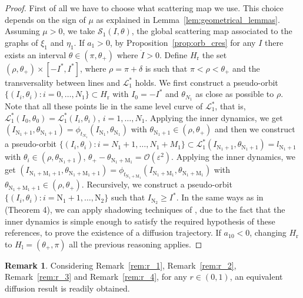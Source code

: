 \documentclass[a4paper,10pt]{article}
\newcommand{\M}{\text{M}}
\newcommand{\NH}{\text{NHIM}}
\newcommand{\zerom}{\text{1}}
\theoremstyle{definition}
\newtheorem{remark}[theorem]{Remark}
\begin{document}
\begin{proof}
First of all we have to choose what scattering map we use.
This choice depends on the sign of $\mu$ as explained in Lemma~\ref{lem:geometrical_lemmas}.
Assuming $\mu >0$, we take $\mathcal{S}_{\zerom}(I,\theta)$, the global scattering map associated to the graphs of $\xi_{\zerom}$ and $\eta_{\zerom}$.
If $a_1 >0$, by Proposition~\ref{prop:orb_cres} for any $I$ there exists an interval $\theta \in (\pi,\theta_+)$ where $\dot{I}>0$.
Define $H_{\text{r}}$ the set $\left(\rho,\theta_+\right)\times\left[-I^*,I^*\right]$, where $\rho = \pi + \delta$ is such that $\pi <\rho<\theta_+$ and  the transversality between {\NH} lines and $\mathcal{L}_1^*$ holds.
We first construct a pseudo-orbit $\{(I_i,\theta_i): i = 0,\dots,N_1\}\subset H_{\text{r}}$ with $I_0 = -I^*$  and $\theta_{N_1}$ as close as possible to $\rho$.
Note that all these points lie in the same level curve of $\mathcal{L}_{\zerom}^*$, that is, $\mathcal{L}_{\zerom}^*(I_0,\theta_0) = \mathcal{L}_{\zerom}^*(I_i,\theta_i)$, $i = 1,\dots,N_1$.
Applying the inner dynamics, we get $(I_{\text{N}_1 + 1},\theta_{\text{N}_1 + 1}) = \phi_{t_{N_1}}(I_{\text{N}_1},\theta_{\text{N}_1} )$ with $\theta_{\text{N}_1 + 1}\in (\rho , \theta_+)$ and then we construct a pseudo-orbit $\{(I_i,\theta_i): i = N_1 +1,\dots,N_1+M_1\}\subset \mathcal{L}_{\zerom}^*(I_{\text{N}_1+1},\theta_{\text{N}_1+1}) = l_{\text{N}_1 +1}$ with $\theta_{i}\in(\rho,\theta_{\text{N}_1 +1})$, $\theta_+ -\theta_{\text{N}_1 + \M_{1}} = \mathcal{O}(\varepsilon^2)$.
Applying the inner dynamics, we get  $(I_{\text{N}_1 + \M_1+1}, \theta_{\text{N}_1 + \M_1+1})=\phi_{t_{\text{N}_1 + \M_1}}(I_{\text{N}_1 + \M_1}, \theta_{\text{N}_1 + \M_1})$ with $\theta_{\text{N}_1 + \M_1 +1}\in (\rho,\theta_+)$.
Recursively, we construct a pseudo-orbit $\{(I_i,\theta_i): i = \text{N}_1 +1,\dots,\text{N}_2\}$ such that $I_{\text{N}_2}\geq I^*$.
In the same ways as in \cite{Delshams2017} (Theorem 4), we can apply shadowing techniques of \cite{fontich2000,fontich2003,Gidea2014}, due to the fact that the inner dynamics is simple enough to satisfy the required hypothesis of these references, to prove the existence of a diffusion trajectory.
If $a_{10}<0$, changing $H_{\text{r}}$ to $H_{\text{l}}=\left(\theta_+,\pi\right)$ all the previous reasoning applies.
\end{proof}

\begin{remark}Considering  Remark~\ref{rem:r_1}, Remark~\ref{rem:r_2}, Remark~\ref{rem:r_3} and  Remark~\ref{rem:r_4}, for any $r\in(0,1)$, an equivalent diffusion result is readily obtained.
\end{remark}
\end{document}
